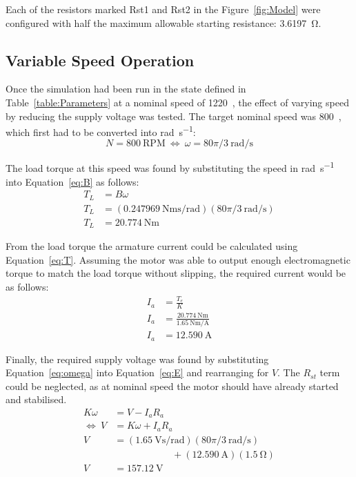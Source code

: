 \documentclass[a4paper,11pt,twocolumn]{article}
\newcommand{\V}{\si{\volt}\xspace}
\newcommand{\A}{\si{\ampere}\xspace}
\newcommand{\Ohm}{\si{\ohm}\xspace}
\newcommand{\Nm}{\si{\newton\metre}\xspace}
\newcommand{\rps}{\si{\radian\per\second}\xspace}
\newcommand{\Vspr}{\si{\volt\second\per\radian}\xspace}
\newcommand{\NmpA}{\si{\newton\metre\per\ampere}\xspace}
\newcommand{\Nmspr}{\si{\newton\metre\second\per\radian}\xspace}
\newcommand{\RPM}{\text{RPM}\xspace}
\begin{document}
Each of the resistors marked Rst1 and Rst2 in the Figure~\vref{fig:Model} were 
configured with half the maximum allowable starting resistance: 3.6197~\Ohm.

\subsection{Variable Speed Operation}

Once the simulation had been run in the state defined in 
Table~\ref{table:Parameters} at a nominal speed of 1220~\RPM, the effect of 
varying speed by reducing the supply voltage was tested. The target nominal 
speed was 800~\RPM, which first had to be converted into \rps:
\begin{equation*}
    N = 800~\RPM~\Leftrightarrow~\omega = 80\pi/3~\rps
\end{equation*}

The load torque at this speed was found by substituting the speed in \rps into 
Equation~\vref{eq:B} as follows:
\begin{align*}
    T_L &= B\omega \\
    T_L &= (0.247969~\Nmspr)(80\pi/3~\rps) \\
    T_L &= 20.774~\Nm
\end{align*}

From the load torque the armature current could be calculated using 
Equation~\ref{eq:T}. Assuming the motor was able to output enough 
electromagnetic torque to match the load torque without slipping, the required 
current would be as follows:
\begin{align*}
    I_a &= \frac{T_e}{K} \\
    I_a &= \frac{20.774~\Nm}{1.65~\NmpA} \\
    I_a &= 12.590~\A
\end{align*}

Finally, the required supply voltage was found by substituting 
Equation~\ref{eq:omega} into Equation~\ref{eq:E} and rearranging for $V$. The 
$R_{st}$ term could be neglected, as at nominal speed the motor should have 
already started and stabilised.
\begin{align*}
    K \omega &= V - I_a R_a \\
    \Leftrightarrow~V &= K \omega + I_a R_a \\
    V &= (1.65~\Vspr)(80\pi/3~\rps) \\
        &\hspace{6em}+ (12.590~\A)(1.5~\Ohm) \\
    V &= 157.12~\V
\end{align*}
\end{document}
